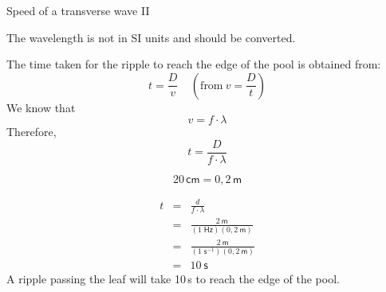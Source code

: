 \begin{definition}
\begin{wex}{Speed of a transverse wave II}
{The wavelength is not in SI units and should be converted.

The time taken for the ripple to reach the edge of the pool is obtained from:
$$t=\frac{D}{v} \ \ \ \ \ (\text{from}\ v=\frac{D}{t})$$
We know that
\begin{equation*}v=f\cdot \lambda\end{equation*}
Therefore,
\begin{equation}t=\frac{D}{f\cdot \lambda}\end{equation}

\begin{equation*}20\,\mathsf{cm}=0,2\,\mathsf{m}\end{equation*}

\begin{eqnarray*}
t&=&\frac{d}{f\cdot \lambda}\\
&=&\frac{2~\mathsf{m}}{(1\;\mathsf{Hz})(0,2~\mathsf{m})}\\
&=&\frac{2~\mathsf{m}}{(1\;\mathsf{s}^{-1})(0,2~\mathsf{m})}\\
&=&10\ \mathsf{s}
\end{eqnarray*}
A ripple passing the leaf will take 10\,s to reach the edge of the pool.}
\end{wex}


\end{definition}
